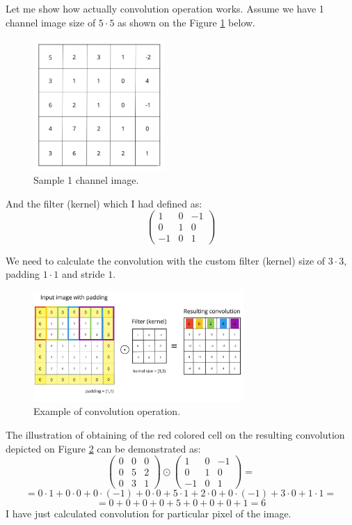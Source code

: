 Let me show how actually convolution operation works. Assume we have 1 channel image size of $5 \cdot 5$ as shown on the Figure \ref{fig:sample_1_channel_image} below.
\begin{figure}[h]
    \centering \includegraphics[width=5cm]{images/1_channel.jpg}
    \caption {Sample 1 channel image.}
    \label {fig:sample_1_channel_image}
\end{figure}

And the filter (kernel) which I had defined as: 
\[ \begin{pmatrix} 1 & 0 & -1 \\ 0 & 1 & 0 \\ -1 & 0 & 1 \end{pmatrix} \]

We need to calculate the convolution with the custom filter (kernel) size of $3 \cdot 3$, padding $1 \cdot 1$ and stride $1$.
\begin{figure}[h]
    \centering \includegraphics[width=8cm]{images/convolution_operation.jpeg}
    \caption {Example of convolution operation.}
    \label{fig:convolution}
\end{figure}

The illustration of obtaining of the red colored cell on the resulting convolution depicted on Figure \ref{fig:convolution} can be demonstrated as:    
\[ \begin{pmatrix} 0 & 0 & 0 \\ 0 & 5 & 2 \\ 0 & 3 & 1 \end{pmatrix} \odot \begin{pmatrix} 1 & 0 & -1 \\ 0 & 1 & 0 \\ -1 & 0 & 1 \end{pmatrix} = \]
\[ = 0 \cdot 1 + 0 \cdot 0 + 0 \cdot (-1) + 0 \cdot 0 + 5 \cdot 1 + 2 \cdot 0 + 0 \cdot (-1) + 3 \cdot 0 + 1 \cdot 1 = \] 
\[ = 0 + 0 + 0 + 0 + 5 + 0 + 0 + 0 + 1= 6 \]
I have just calculated convolution for particular pixel of the image. 

